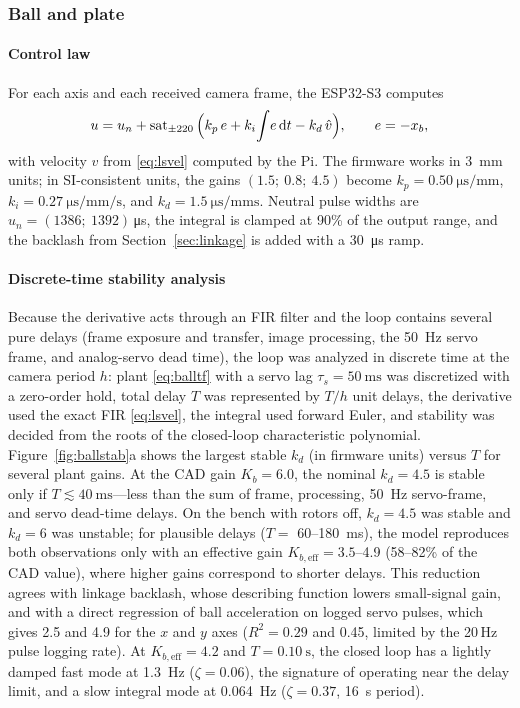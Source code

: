 \subsubsection{Ball and plate}
\label{sec:ballcontrol}

\paragraph{Control law}
For each axis and each received camera frame, the ESP32-S3 computes
\begin{equation}
  u=u_n+\operatorname{sat}_{\pm220}\Big(k_p\,e+k_i\!\int\!e\,\mathrm{d} t-k_d\,\hat v\Big),\qquad e=-x_b,
  \label{eq:ballpid}
\end{equation}
with velocity $\hat v$ from \eqref{eq:lsvel} computed by the Pi. The firmware works in \SI{3}{\milli\metre} units; in SI-consistent units, the gains $(1.5;\ 0.8;\ 4.5)$ become $k_p=\SI{0.50}{\micro\second\per\milli\metre}$, $k_i=\SI{0.27}{\micro\second\per\milli\metre\per\second}$, and $k_d=\SI{1.5}{\micro\second\per\milli\metre\second}$. Neutral pulse widths are $u_n=(1386;\ 1392)$\,\si{\micro\second}, the integral is clamped at 90\% of the output range, and the backlash from Section~\ref{sec:linkage} is added with a \SI{30}{\micro\second} ramp.

\paragraph{Discrete-time stability analysis}
Because the derivative acts through an FIR filter and the loop contains several pure delays (frame exposure and transfer, image processing, the \SI{50}{\hertz} servo frame, and analog-servo dead time), the loop was analyzed in discrete time at the camera period $h$: plant \eqref{eq:balltf} with a servo lag $\tau_s=\SI{50}{\milli\second}$ was discretized with a zero-order hold, total delay $T$ was represented by $T/h$ unit delays, the derivative used the exact FIR \eqref{eq:lsvel}, the integral used forward Euler, and stability was decided from the roots of the closed-loop characteristic polynomial. Figure~\ref{fig:ballstab}a shows the largest stable $k_d$ (in firmware units) versus $T$ for several plant gains. At the CAD gain $K_b=6.0$, the nominal $k_d=4.5$ is stable only if $T\lesssim\SI{40}{\milli\second}$---less than the sum of frame, processing, \SI{50}{\hertz} servo-frame, and servo dead-time delays. On the bench with rotors off, $k_d=4.5$ was stable and $k_d=6$ was unstable; for plausible delays ($T=$ 60--\SI{180}{\milli\second}), the model reproduces both observations only with an effective gain $K_{b,\mathrm{eff}}=3.5$--4.9 (58--82\% of the CAD value), where higher gains correspond to shorter delays. This reduction agrees with linkage backlash, whose describing function lowers small-signal gain, and with a direct regression of ball acceleration on logged servo pulses, which gives 2.5 and 4.9 for the $x$ and $y$ axes ($R^2=0.29$ and 0.45, limited by the 20\,Hz pulse logging rate). At $K_{b,\mathrm{eff}}=4.2$ and $T=\SI{0.10}{\second}$, the closed loop has a lightly damped fast mode at \SI{1.3}{\hertz} ($\zeta=0.06$), the signature of operating near the delay limit, and a slow integral mode at \SI{0.064}{\hertz} ($\zeta=0.37$, \SI{16}{\second} period).

